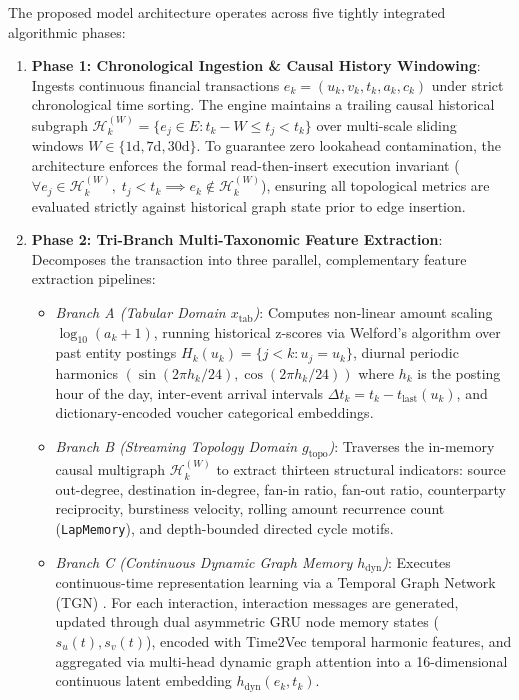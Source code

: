The proposed model architecture operates across five tightly integrated algorithmic phases:
\begin{enumerate}
    \item \textbf{Phase 1: Chronological Ingestion \& Causal History Windowing}: Ingests continuous financial transactions $e_k = (u_k, v_k, t_k, a_k, c_k)$ under strict chronological time sorting. The engine maintains a trailing causal historical subgraph $\mathcal{H}_k^{(W)} = \{ e_j \in E : t_k - W \le t_j < t_k \}$ over multi-scale sliding windows $W \in \{1\text{d}, 7\text{d}, 30\text{d}\}$. To guarantee zero lookahead contamination, the architecture enforces the formal read-then-insert execution invariant ($\forall e_j \in \mathcal{H}_k^{(W)}, \; t_j < t_k \implies e_k \notin \mathcal{H}_k^{(W)}$), ensuring all topological metrics are evaluated strictly against historical graph state prior to edge insertion.
    \item \textbf{Phase 2: Tri-Branch Multi-Taxonomic Feature Extraction}: Decomposes the transaction into three parallel, complementary feature extraction pipelines:
    \begin{itemize}
        \item \textit{Branch A (Tabular Domain $x_{\text{tab}}$)}: Computes non-linear amount scaling $\log_{10}(a_k + 1)$, running historical z-scores via Welford's algorithm over past entity postings $H_k(u_k) = \{j < k : u_j = u_k\}$, diurnal periodic harmonics $(\sin(2\pi h_k / 24), \cos(2\pi h_k / 24))$ where $h_k$ is the posting hour of the day, inter-event arrival intervals $\Delta t_k = t_k - t_{\text{last}}(u_k)$, and dictionary-encoded voucher categorical embeddings.
        \item \textit{Branch B (Streaming Topology Domain $g_{\text{topo}}$)}: Traverses the in-memory causal multigraph $\mathcal{H}_k^{(W)}$ to extract thirteen structural indicators: source out-degree, destination in-degree, fan-in ratio, fan-out ratio, counterparty reciprocity, burstiness velocity, rolling amount recurrence count (\texttt{LapMemory}), and depth-bounded directed cycle motifs.
        \item \textit{Branch C (Continuous Dynamic Graph Memory $h_{\text{dyn}}$)}: Executes continuous-time representation learning via a Temporal Graph Network (TGN) \cite{rossi2020temporal}. For each interaction, interaction messages are generated, updated through dual asymmetric GRU node memory states ($s_u(t), s_v(t)$), encoded with Time2Vec temporal harmonic features, and aggregated via multi-head dynamic graph attention into a 16-dimensional continuous latent embedding $h_{\text{dyn}}(e_k, t_k)$.

\end{itemize}
\end{enumerate}
